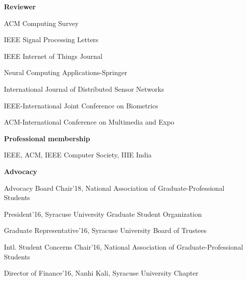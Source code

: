 
\hspace{-0.3in}\textbf{Reviewer} 

\hspace{-0.2in}ACM Computing Survey

\hspace{-0.2in}IEEE Signal Processing Letters 

\hspace{-0.2in}IEEE Internet of Things Journal

\hspace{-0.2in}Neural Computing Applications-Springer

\hspace{-0.2in}International Journal of Distributed Sensor Networks

\hspace{-0.2in}IEEE-International Joint Conference on Biometrics

\hspace{-0.2in}ACM-International Conference on Multimedia and Expo

\hspace{-0.3in}\textbf{Professional membership} 

\hspace{-0.2in}IEEE, ACM, IEEE Computer Society, IIIE India

\hspace{-0.3in}\textbf{Advocacy} 

\hspace{-0.2in}Advocacy Board Chair'18, National Association of Graduate-Professional Students

\hspace{-0.2in}President'16, Syracuse University Graduate Student Organization

\hspace{-0.2in}Graduate Representative'16, Syracuse University Board of Trustees

\hspace{-0.2in}Intl. Student Concerns Chair'16, National Association of Graduate-Professional Students 

\hspace{-0.2in}Director of Finance'16, Nanhi Kali, Syracuse University Chapter